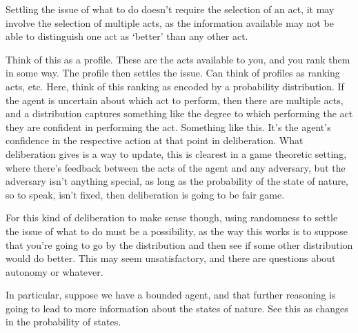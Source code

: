 \documentclass[10pt]{article}
\begin{document}
Settling the issue of what to do doesn't require the selection of an act, it may involve the selection of multiple acts, as the information available may not be able to distinguish one act as `better' than any other act.

Think of this as a profile.
These are the acts available to you, and you rank them in some way.
The profile then settles the issue.
Can think of profiles as ranking acts, etc.
Here, think of this ranking as encoded by a probability distribution.
If the agent is uncertain about which act to perform, then there are multiple acts, and a distribution captures something like the degree to which performing the act they are confident in performing the act.
Something like this.
It's the agent's confidence in the respective action at that point in deliberation.
What deliberation gives is a way to update, this is clearest in a game theoretic setting, where there's feedback between the acts of the agent and any adversary, but the adversary isn't anything special, as long as the probability of the state of nature, so to speak, isn't fixed, then deliberation is going to be fair game.

For this kind of deliberation to make sense though, using randomness to settle the issue of what to do must be a possibility, as the way this works is to suppose that you're going to go by the distribution and then see if some other distribution would do better.
This may seem unsatisfactory, and there are questions about autonomy or whatever.


In particular, suppose we have a bounded agent, and that further reasoning is going to lead to more information about the states of nature.
See this as changes in the probability of states.
\end{document}
